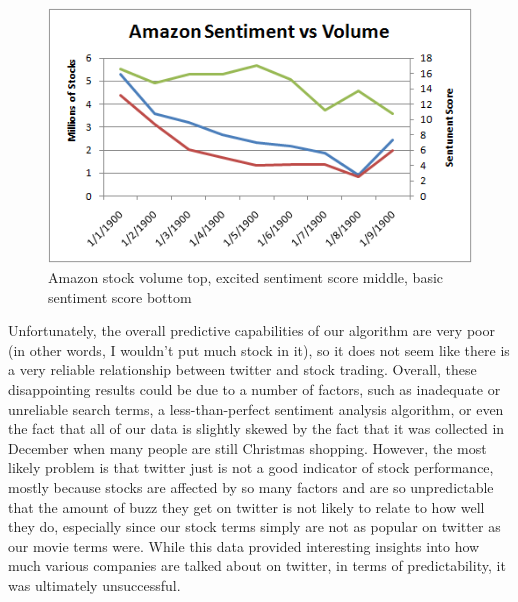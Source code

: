 \documentclass[11pt]{article}
\begin{document}
\begin{figure}[ht!]
\centering
\includegraphics[scale=.55]{img/amavol.png} 
\caption{Amazon stock volume top, excited sentiment score middle, basic sentiment score bottom }
\label{fig:amavol}
\end{figure}


Unfortunately, the overall predictive capabilities of our algorithm are very poor (in other words, I wouldn’t put much stock in it), so it does not seem like there is a very reliable relationship between twitter and stock trading.  Overall, these disappointing results could be due to a number of factors, such as inadequate or unreliable search terms, a less-than-perfect sentiment analysis algorithm, or even the fact that all of our data is slightly skewed by the fact that it was collected in December when many people are still Christmas shopping.  However, the most likely problem is that twitter just is not a good indicator of stock performance, mostly because stocks are affected by so many factors and are so unpredictable that the amount of buzz they get on twitter is not likely to relate to how well they do, especially since our stock terms simply are not as popular on twitter as our movie terms were.  While this data provided interesting insights into how much various companies are talked about on twitter, in terms of predictability, it was ultimately unsuccessful.
\end{document}
